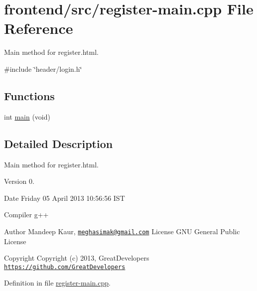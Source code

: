 \hypertarget{register-main_8cpp}{\section{frontend/src/register-\/main.cpp \-File \-Reference}
\label{d2/d30/register-main_8cpp}
}


\-Main method for register.\-html.  


{\ttfamily \#include \char`\"{}header/login.\-h\char`\"{}}\*
\subsection*{\-Functions}
\begin{DoxyCompactItemize}
\item 
int \hyperlink{register-main_8cpp_a840291bc02cba5474a4cb46a9b9566fe}{main} (void)
\end{DoxyCompactItemize}


\subsection{\-Detailed \-Description}
\-Main method for register.\-html. \begin{DoxyVersion}{\-Version}
0. 
\end{DoxyVersion}
\begin{DoxyDate}{\-Date}
\-Friday 05 \-April 2013 10\-:56\-:56 \-I\-S\-T\par
 \-Compiler g++
\end{DoxyDate}
\begin{DoxyAuthor}{\-Author}
\-Mandeep \-Kaur, \href{mailto:meghasimak@gmail.com}{\tt meghasimak@gmail.\-com} \-License \-G\-N\-U \-General \-Public \-License 
\end{DoxyAuthor}
\begin{DoxyCopyright}{\-Copyright}
\-Copyright (c) 2013, \-Great\-Developers \href{https://github.com/GreatDevelopers}{\tt https\-://github.\-com/\-Great\-Developers} 
\end{DoxyCopyright}


\-Definition in file \hyperlink{register-main_8cpp_source}{register-\/main.\-cpp}.



